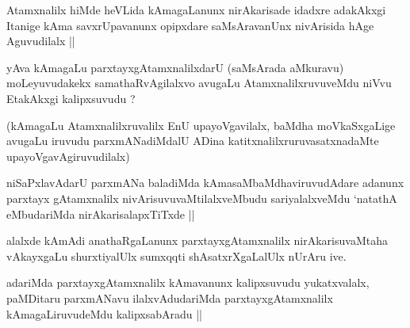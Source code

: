 
\begin{artha}
Atamxnalilx hiMde heVLida kAmagaLanunx nirAkarisade idadxre
adakAkxgi Itanige kAma savxrUpavanunx opipxdare saMsAravanUnx
nivArisida hAge Aguvudilalx ||
\end{artha}


\begin{artha}
yAva kAmagaLu parxtayxgAtamxnalilxdarU (saMsArada aMkuravu)
moLeyuvudakekx samathaRvAgilalxvo avugaLu AtamxnalilxruvuveMdu niVvu
EtakAkxgi kalipxsuvudu ?
\end{artha}

\begin{artha}
(kAmagaLu Atamxnalilxruvalilx EnU upayoVgavilalx, baMdha moVkaSxgaLige
  avugaLu iruvudu parxmANadiMdalU ADina katitxnalilxruruvasatxnadaMte upayoVgavAgiruvudilalx)
\end{artha}

\begin{artha}
niSaPxlavAdarU parxmANa baladiMda kAmasaMbaMdhaviruvudAdare adanunx
parxtayx gAtamxnalilx nivArisuvuvaMtilalxveMbudu sariyalalxveMdu
`natathA eMbudariMda nirAkarisalapxTiTxde ||
\end{artha}


\begin{artha}
alalxde kAmAdi anathaRgaLanunx parxtayxgAtamxnalilx nirAkarisuvaMtaha
vAkayxgaLu shurxtiyalUlx sumxqqti shAsatxrXgaLalUlx nUrAru ive.
\end{artha}



\begin{artha}
adariMda parxtayxgAtamxnalilx kAmavanunx kalipxsuvudu yukatxvalalx,
paMDitaru parxmANavu ilalxvAdudariMda parxtayxgAtamxnalilx
kAmagaLiruvudeMdu kalipxsabAradu ||
\end{artha}



